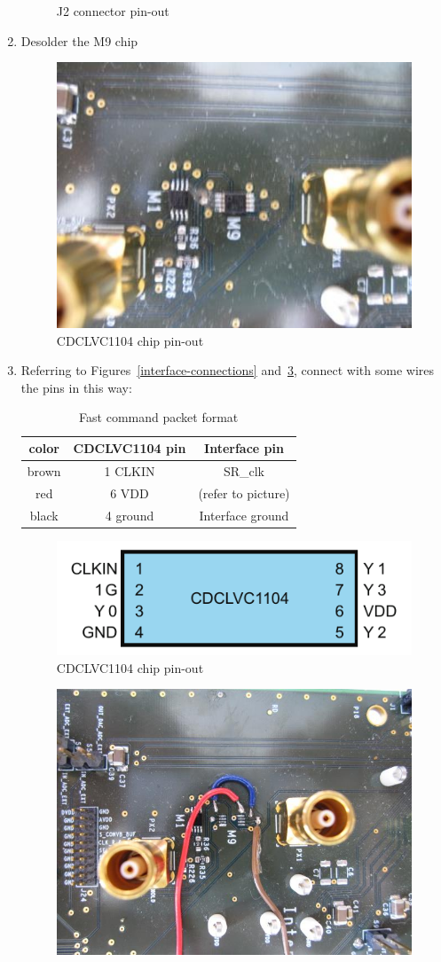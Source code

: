 \begin{enumerate}
\begin{figure}[H]
    \caption{J2 connector pin-out}\label{J2}
  \end{figure}
\item Desolder the M9 chip
  \begin{figure}[H]
    \centering \includegraphics[frame,width=0.5\linewidth]{desolder}
    \caption{CDCLVC1104 chip pin-out}\label{desolder}
  \end{figure}
\item Referring to Figures~\ref{interface-connections}
  and~\ref{buffer-blueprint}, connect with some wires the pins in this
  way:
  \begin{table}[H]
    \centering \bgroup
    \def\arraystretch{1.5}%
    \begin{tabular}{|c|c|c|}
      \hline
      \textbf{color} & \textbf{CDCLVC1104 pin} & \textbf{Interface pin} \\
      \hline
      brown & 1 CLKIN & SR\_clk \\
      \hline
      red & 6 VDD & (refer to picture) \\
      \hline
      black & 4 ground & Interface ground \\
      \hline
    \end{tabular}
    \egroup
    \caption{Fast command packet format}
  \end{table} 
  \begin{figure}[H]
    \centering \includegraphics[width=0.7\linewidth]{buffer-blueprint}
    \caption{CDCLVC1104 chip pin-out}\label{buffer-blueprint}
  \end{figure}
  \begin{figure}[H]
    \centering
    \includegraphics[frame,width=.3\textwidth]{interface-pinout1}\hfill

\end{figure}
\end{enumerate}
